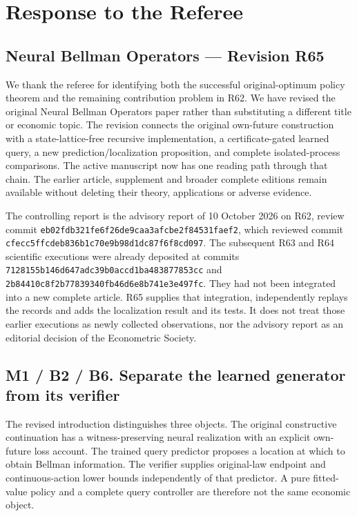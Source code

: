 \hypertarget{response-to-the-referee}{%
\section{Response to the Referee}\label{response-to-the-referee}}

\hypertarget{neural-bellman-operators-revision-r65}{%
\subsection{Neural Bellman Operators --- Revision
R65}\label{neural-bellman-operators-revision-r65}}

We thank the referee for identifying both the successful
original-optimum policy theorem and the remaining contribution problem
in R62. We have revised the original Neural Bellman Operators paper
rather than substituting a different title or economic topic. The
revision connects the original own-future construction with a
state-lattice-free recursive implementation, a certificate-gated learned
query, a new prediction/localization proposition, and complete
isolated-process comparisons. The active manuscript now has one reading
path through that chain. The earlier article, supplement and broader
complete editions remain available without deleting their theory,
applications or adverse evidence.

The controlling report is the advisory report of 10 October 2026 on R62,
review commit \texttt{eb02fdb321fe6f26de9caa3afcbe2f84531faef2}, which
reviewed commit \texttt{cfecc5ffcdeb836b1c70e9b98d1dc87f6f8cd097}. The
subsequent R63 and R64 scientific executions were already deposited at
commits \texttt{7128155b146d647adc39b0accd1ba483877853cc} and
\texttt{2b84410c8f2b77839340fb46d6e8b741e3e497fc}. They had not been
integrated into a new complete article. R65 supplies that integration,
independently replays the records and adds the localization result and
its tests. It does not treat those earlier executions as newly collected
observations, nor the advisory report as an editorial decision of the
Econometric Society.

\hypertarget{m1-b2-b6.-separate-the-learned-generator-from-its-verifier}{%
\subsection{M1 / B2 / B6. Separate the learned generator from its
verifier}\label{m1-b2-b6.-separate-the-learned-generator-from-its-verifier}}

The revised introduction distinguishes three objects. The original
constructive continuation has a witness-preserving neural realization
with an explicit own-future loss account. The trained query predictor
proposes a location at which to obtain Bellman information. The verifier
supplies original-law endpoint and continuous-action lower bounds
independently of that predictor. A pure fitted-value policy and a
complete query controller are therefore not the same economic object.

